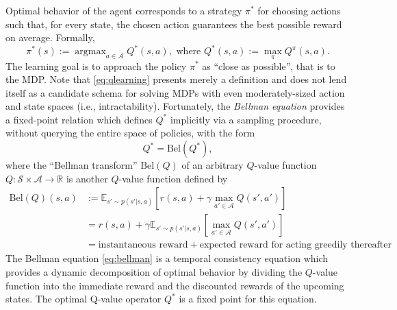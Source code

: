 \documentclass[10pt,letterpaper]{article}
\DeclareMathOperator{\argmax}{argmax}
\begin{document}
Optimal behavior of the agent corresponds to
a strategy $\pi^*$ for choosing actions such that, for every state, the chosen action guarantees the best possible reward on average. Formally,
\begin{equation}
  \pi^*(s) := \argmax_{a \in \mathcal A}{Q}^*(s, a),\text{ where }Q^*(s, a) := \max_{\pi}Q^\pi(s,a).
  \label{eq:qlearning}
\end{equation}
The learning goal is to approach the
policy $\pi^*$ as ``close as possible'', that is to  the MDP.
Note that \eqref{eq:qlearning} presents merely a definition and
does not lend itself as a candidate schema
for solving MDPs with even moderately-sized action and state spaces
(i.e., intractability).
Fortunately, the \textit{Bellman equation} \citep{sutton1998reinforcement} provides a fixed-point relation which defines $Q^*$ implicitly via a sampling procedure, without querying the entire space of policies, with the form
\begin{equation}
  Q^* = \text{Bel}(Q^*),
  \label{eq:bellman}
\end{equation}
where the ``Bellman transform'' $\text{Bel}(Q)$ of an arbitrary $Q$-value function $Q: \mathcal S \times \mathcal A \rightarrow \mathbb R$  is another $Q$-value function defined by
\begin{equation}
  \begin{split}
   \text{Bel}(Q)(s,a) &:=
   \mathbb E_{s' \sim p(s'|s,a)} [r(s,a) + \gamma \max_{a' \in \mathcal A}Q(s', a')]\\
   &= r(s,a) + \gamma\mathbb E_{s' \sim p(s'|s,a)} [\max_{a' \in \mathcal A}Q(s', a')]\\
   &= \text{instantaneous reward} + \text{expected reward for acting greedily thereafter}
    \end{split}
  \end{equation}
The Bellman equation \eqref{eq:bellman} is a temporal consistency equation which provides
a dynamic decomposition of optimal behavior by dividing the $Q$-value function into the immediate
reward and the discounted rewards of the upcoming states.
The optimal Q-value operator $Q^*$ is a fixed point for this equation.
\end{document}
